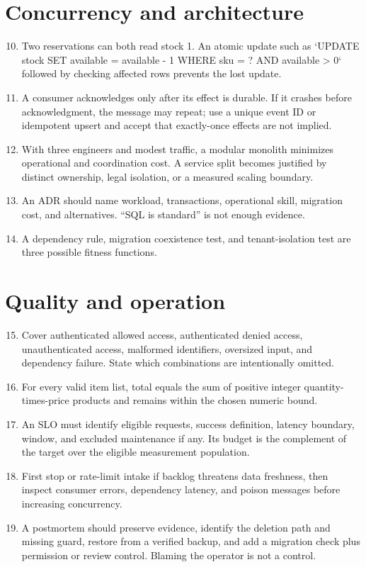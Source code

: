 \section{Concurrency and architecture}
\begin{enumerate}
  \setcounter{enumi}{9}
  \item Two reservations can both read stock 1. An atomic update such as
        `UPDATE stock SET available = available - 1 WHERE sku = ? AND available > 0`
        followed by checking affected rows prevents the lost update.
  \item A consumer acknowledges only after its effect is durable. If it crashes
        before acknowledgment, the message may repeat; use a unique event ID or
        idempotent upsert and accept that exactly-once effects are not implied.
  \item With three engineers and modest traffic, a modular monolith minimizes
        operational and coordination cost. A service split becomes justified by
        distinct ownership, legal isolation, or a measured scaling boundary.
  \item An ADR should name workload, transactions, operational skill, migration
        cost, and alternatives. “SQL is standard” is not enough evidence.
  \item A dependency rule, migration coexistence test, and tenant-isolation test
        are three possible fitness functions.
\end{enumerate}

\section{Quality and operation}
\begin{enumerate}
  \setcounter{enumi}{14}
  \item Cover authenticated allowed access, authenticated denied access,
        unauthenticated access, malformed identifiers, oversized input, and
        dependency failure. State which combinations are intentionally omitted.
  \item For every valid item list, total equals the sum of positive integer
        quantity-times-price products and remains within the chosen numeric bound.
  \item An SLO must identify eligible requests, success definition, latency
        boundary, window, and excluded maintenance if any. Its budget is the
        complement of the target over the eligible measurement population.
  \item First stop or rate-limit intake if backlog threatens data freshness, then
        inspect consumer errors, dependency latency, and poison messages before
        increasing concurrency.
  \item A postmortem should preserve evidence, identify the deletion path and
        missing guard, restore from a verified backup, and add a migration check
        plus permission or review control. Blaming the operator is not a control.
\end{enumerate}

